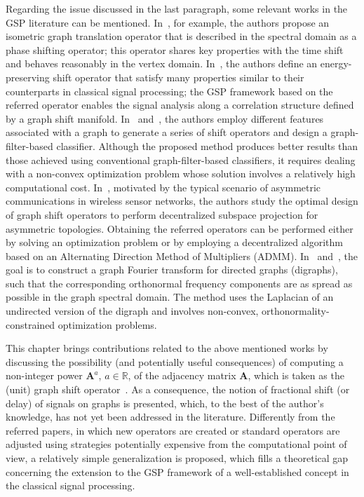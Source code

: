     {Regarding the issue discussed in the last paragraph, some relevant works in the GSP literature can be mentioned. In~\cite{girault2015translation}, for example, the authors propose an isometric graph translation operator that is described in the spectral domain as a phase shifting operator; this operator shares key properties with the time shift and behaves reasonably in the vertex domain. In~\cite{gavili2017}, the authors define an energy-preserving shift operator that satisfy many properties similar to their counterparts in classical signal processing; the GSP framework based on the referred operator enables the signal analysis along a correlation structure defined by a graph shift manifold. In~\cite{fan20191} and~\cite{fan2019}, the authors employ different features associated with a graph to generate a series of shift operators and design a graph-filter-based classifier. Although the proposed method produces better results than those achieved using conventional graph-filter-based classifiers, it requires dealing with a non-convex optimization problem whose solution involves a relatively high computational cost. In~\cite{mollaebrahim2021}, motivated by the typical scenario of asymmetric communications in wireless sensor networks, the authors study the optimal design of graph shift operators to perform decentralized subspace projection for asymmetric topologies. Obtaining the referred operators can be performed either by solving an optimization problem or by employing a decentralized algorithm based on an Alternating Direction Method of Multipliers (ADMM). In~\cite{shafipour2018} and~\cite{shafipour2019}, the goal is to construct a graph Fourier transform for directed graphs (digraphs), such that the corresponding orthonormal frequency components are as spread as possible in the graph spectral domain. The method uses the Laplacian of an undirected version of the digraph and involves non-convex, orthonormality-constrained optimization problems.}

    {This chapter brings contributions related to the above mentioned works by discussing the} possibility (and potentially useful consequences) of {computing} a non-integer power $\mathbf{A}^a$, $a\in\mathbb{R}$, of the adjacency matrix $\mathbf{A}$, {which is taken as} the (unit) graph shift operator~\cite{sandryhaila2014big}. {As a consequence}, the notion of fractional shift (or delay) of signals on graphs is presented, {which, to the best of the author's knowledge, has not yet been addressed in the literature. Differently from the referred papers, in which new operators are created or standard operators are adjusted using strategies potentially expensive from the computational point of view, a relatively simple generalization is proposed, which fills a theoretical gap concerning the extension to the GSP framework of a well-established concept in the classical signal processing.}

